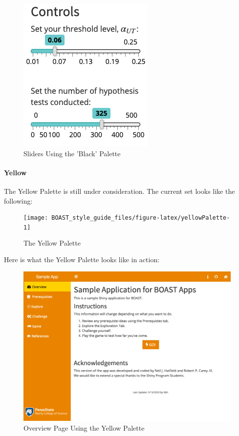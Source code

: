 \documentclass[
]{book}
\begin{document}
\begin{figure}

{\centering \includegraphics{images/blackSliders} 

}

\caption{Sliders Using the 'Black' Palette}\label{fig:blackAction3}
\end{figure}

\hypertarget{yellow}{%
\paragraph{Yellow}\label{yellow}}

The Yellow Palette is still under consideration. The current set looks like the following:

\begin{figure}

{\centering \texttt{[image: BOAST\_style\_guide\_files/figure-latex/yellowPalette-1]} 

}

\caption{The Yellow Palette}\label{fig:yellowPalette}
\end{figure}

Here is what the Yellow Palette looks like in action:

\begin{figure}

{\centering \includegraphics[width=14in]{images/yellowOverview} 

}

\caption{Overview Page Using the Yellow Palette}\label{fig:yellowAction1}
\end{figure}
\end{document}
